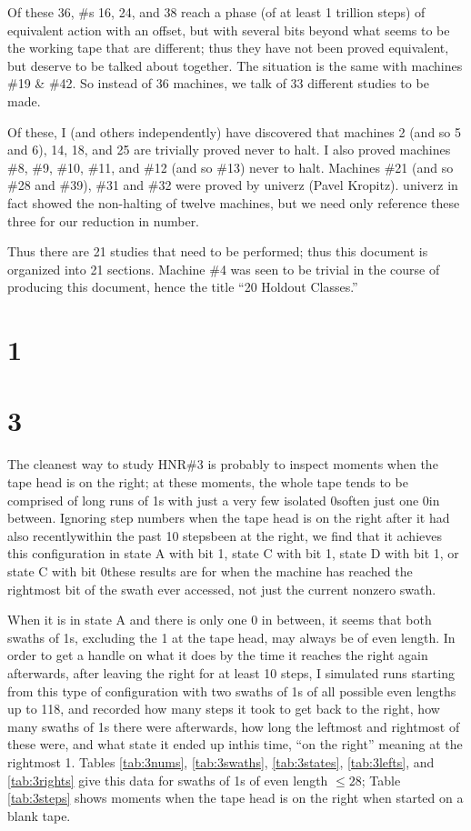 \documentclass[12pt]{article}
\begin{document}
Of these 36, \#s 16, 24, and 38 reach a phase (of at least 1 trillion steps) of equivalent action with an offset, but with several bits beyond what seems to be the working tape that are different; thus they have not been proved equivalent, but deserve to be talked about together. The situation is the same with machines \#19 \& \#42. So instead of 36 machines, we talk of 33 different studies to be made.

Of these, I (and others independently) have discovered that machines 2 (and so 5 and 6), 14, 18, and 25 are trivially proved never to halt. I also proved machines \#8, \#9, \#10, \#11, and \#12 (and so \#13) never to halt. Machines \#21 (and so \#28 and \#39), \#31 and \#32 were proved by univerz (Pavel Kropitz). univerz in fact showed the non-halting of twelve machines, but we need only reference these three for our reduction in number.

Thus there are 21 studies that need to be performed; thus this document is organized into 21 sections. Machine \#4 was seen to be trivial in the course of producing this document, hence the title ``20 Holdout Classes.''
\newpage
\tableofcontents
\clearpage
{}
{}
\section*{1}
\clearpage
{}
{}
\section*{3}
The cleanest way to study HNR\#3 is probably to inspect moments when the tape head is on the right; at these moments, the whole tape tends to be comprised of long runs of 1s with just a very few isolated 0s\textemdash often just one 0\textemdash in between. Ignoring step numbers when the tape head is on the right after it had also recently\textemdash within the past 10 steps\textemdash been at the right, we find that it achieves this configuration in state A with bit 1, state C with bit 1, state D with bit 1, or state C with bit 0\textemdash these results are for when the machine has reached the rightmost bit of the swath ever accessed, not just the current nonzero swath.

When it is in state A and there is only one 0 in between, it seems that both swaths of 1s, excluding the 1 at the tape head, may always be of even length. In order to get a handle on what it does by the time it reaches the right again afterwards, after leaving the right for at least 10 steps, I simulated runs starting from this type of configuration with two swaths of 1s of all possible even lengths up to 118, and recorded how many steps it took to get back to the right, how many swaths of 1s there were afterwards, how long the leftmost and rightmost of these were, and what state it ended up in\textemdash this time, ``on the right'' meaning at the rightmost 1. Tables \ref{tab:3nums}, \ref{tab:3swaths}, \ref{tab:3states}, \ref{tab:3lefts}, and \ref{tab:3rights} give this data for swaths of 1s of even length $\leq28$; Table \ref{tab:3steps} shows moments when the tape head is on the right when started on a blank tape.
\end{document}
